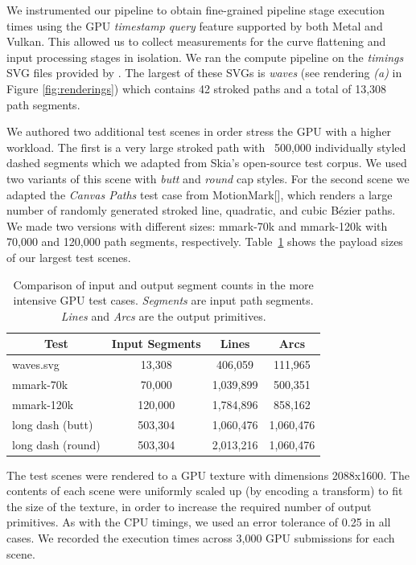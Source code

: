 \documentclass[sigconf, authordraft]{acmart}
\begin{document}
We instrumented our pipeline to obtain fine-grained pipeline stage execution times using the GPU \emph{timestamp query} feature supported by both Metal and Vulkan. This allowed us to collect measurements for the curve flattening and input processing stages in isolation. We ran the compute pipeline on the \emph{timings} SVG files provided by \citet{Nehab2020}. The largest of these SVGs is \emph{waves} (see rendering \emph{(a)} in Figure \ref{fig:renderings}) which contains 42 stroked paths and a total of 13,308 path segments.

We authored two additional test scenes in order stress the GPU with a higher workload. The first is a very large stroked path with ~500,000 individually styled dashed segments which we adapted from Skia's open-source test corpus. We used two variants of this scene with \emph{butt} and \emph{round} cap styles. For the second scene we adapted the \emph{Canvas Paths} test case from MotionMark[], which renders a large number of randomly generated stroked line, quadratic, and cubic Bézier paths. We made two versions with different sizes: mmark-70k and mmark-120k with 70,000 and 120,000 path segments, respectively. Table~\ref{table:bump-counts} shows the payload sizes of our largest test scenes.

\begin{table}
    \caption{Comparison of input and output segment counts in the more intensive GPU test cases. \emph{Segments} are input path segments. \emph{Lines} and \emph{Arcs} are the output primitives.}
    \begin{tabular}{|l|c|c|c|}
    \hline
        \multicolumn{1}{|c|}{\textbf{Test}} & \textbf{Input Segments} & \textbf{Lines} & \textbf{Arcs} \\
    \hline
        waves.svg & 13,308 & 406,059 & 111,965 \\
        mmark-70k & 70,000 & 1,039,899 & 500,351 \\
        mmark-120k & 120,000 & 1,784,896 & 858,162 \\
        long dash (butt) & 503,304 & 1,060,476 & 1,060,476 \\
        long dash (round) & 503,304 & 2,013,216 & 1,060,476 \\
    \hline
    \end{tabular}
    \label{table:bump-counts}
\end{table}

The test scenes were rendered to a GPU texture with dimensions 2088x1600. The contents of each scene were uniformly scaled up (by encoding a transform) to fit the size of the texture, in order to increase the required number of output primitives. As with the CPU timings, we used an error tolerance of 0.25 in all cases. We recorded the execution times across 3,000 GPU submissions for each scene.
\end{document}
